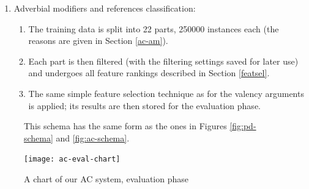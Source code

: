 \documentclass[12pt,notitlepage,a4paper]{report}
\begin{document}
\begin{enumerate}
\begin{enumerate}
    \end{enumerate}
    \item Adverbial modifiers and references classification:
    \begin{enumerate}
        \item The training data is split into 22 parts, 250000 instances each (the reasons are given in Section \ref{ac-am}).
        \item Each part is then filtered (with the filtering settings saved for later use) and undergoes all feature rankings described in Section \ref{featsel}.
        \item The same simple feature selection technique as for the valency arguments is applied; its results are then stored for the evaluation phase.
    \end{enumerate}
\end{enumerate}

\begin{figure}[tb]\footnotesize
\caption{A chart of our AC system, evaluation phase}\label{fig:ac-eval}
\noindent This schema has the same form as the ones in Figures \ref{fig:pd-schema} and \ref{fig:ac-schema}.
\begin{center}
\texttt{[image: ac-eval-chart]}
\end{center}
\end{figure}
\end{document}
